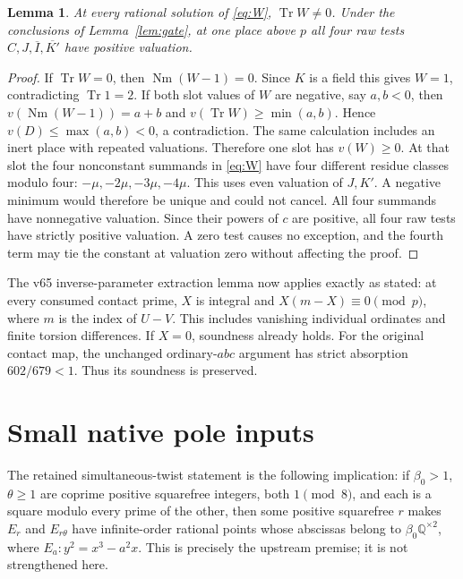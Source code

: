 \documentclass[11pt,a4paper]{article}
\newtheorem{lemma}[theorem]{Lemma}
\newcommand{\Q}{\mathbb Q}\newcommand{\Z}{\mathbb Z}
\DeclareMathOperator{\Tr}{Tr}\DeclareMathOperator{\Nm}{Nm}
\begin{document}
\begin{lemma}\label{lem:select}
At every rational solution of \eqref{eq:W}, $\Tr W\ne0$.
Under the conclusions of Lemma~\ref{lem:gate}, at one place above $p$
all four raw tests $C,J,\overline I,\overline {K'}$ have positive valuation.
\end{lemma}
\begin{proof}
If $\Tr W=0$, then $\Nm(W-1)=0$. Since $K$ is a field this gives
$W=1$, contradicting $\Tr 1=2$.
If both slot values of $W$ are negative, say $a,b<0$, then
$v(\Nm(W-1))=a+b$ and $v(\Tr W)\ge\min(a,b)$.
Hence $v(D)\le\max(a,b)<0$, a contradiction. The same calculation
includes an inert place with repeated valuations. Therefore one slot
has $v(W)\ge0$. At that slot the four nonconstant summands in
\eqref{eq:W} have four different residue classes modulo four:
$-\mu,-2\mu,-3\mu,-4\mu$. This uses even valuation of $J,K'$.
A negative minimum would therefore be unique and could not cancel.
All four summands have nonnegative valuation. Since their powers of $c$
are positive, all four raw tests have strictly positive valuation.
A zero test causes no exception, and the fourth term may tie the
constant at valuation zero without affecting the proof.
\end{proof}

The v65 inverse-parameter extraction lemma now applies exactly as
stated: at every consumed contact prime, $X$ is integral and
$X(m-X)\equiv0\pmod p$, where $m$ is the index of $U-V$.
This includes vanishing individual ordinates and finite torsion
 differences. If $X=0$, soundness already holds. For the original
contact map, the unchanged ordinary-$abc$ argument has strict
absorption $602/679<1$. Thus its soundness is preserved.

\section{Small native pole inputs}\label{sec:small}
The retained simultaneous-twist statement is the following implication:
if $\beta_0>1$, $\theta\ge1$ are coprime positive squarefree integers,
both $1\pmod8$, and each is a square modulo every prime of the other,
then some positive squarefree $r$ makes $E_r$ and $E_{r\theta}$ have
infinite-order rational points whose abscissas belong to
$\beta_0\Q^{\times2}$, where $E_a:y^2=x^3-a^2x$.
This is precisely the upstream premise; it is not strengthened here.
\end{document}
